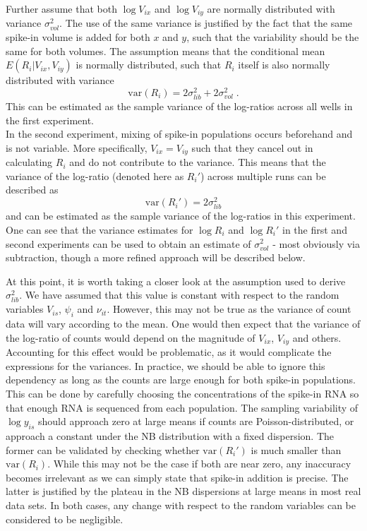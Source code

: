 \documentclass{article}
\begin{document}
Further assume that both $\log V_{ix}$ and $\log V_{iy}$ are normally distributed with variance $\sigma^2_{vol}$.
The use of the same variance is justified by the fact that the same spike-in volume is added for both $x$ and $y$, such that the variability should be the same for both volumes.
The assumption means that the conditional mean $E(R_i |V_{ix}, V_{iy})$ is normally distributed, such that $R_i$ itself is also normally distributed with variance
\[
\mbox{var}(R_i) = 2\sigma^2_{lib} + 2\sigma_{vol}^2 \;. 
\]
This can be estimated as the sample variance of the log-ratios across all wells in the first experiment. \\[0.1in]

In the second experiment, mixing of spike-in populations occurs beforehand and is not variable.
More specifically, $V_{ix}=V_{iy}$ such that they cancel out in calculating $R_i$ and do not contribute to the variance.
This means that the variance of the log-ratio (denoted here as $R_i'$) across multiple runs can be described as
\[
\mbox{var}(R_i') = 2\sigma^2_{lib}
\]
and can be estimated as the sample variance of the log-ratios in this experiment.
One can see that the variance estimates for $\log R_i$ and $\log R_i'$ in the first and second experiments can be used to obtain an estimate of $\sigma^2_{vol}$ - most obviously via subtraction, though a more refined approach will be described below. 

At this point, it is worth taking a closer look at the assumption used to derive $\sigma^2_{lib}$.
We have assumed that this value is constant with respect to the random variables $V_{is}$, $\psi_i$ and $\nu_{it}$.
However, this may not be true as the variance of count data will vary according to the mean.
One would then expect that the variance of the log-ratio of counts would depend on the magnitude of $V_{ix}$, $V_{iy}$ and others.
Accounting for this effect would be problematic, as it would complicate the expressions for the variances.
In practice, we should be able to ignore this dependency as long as the counts are large enough for both spike-in populations.
This can be done by carefully choosing the concentrations of the spike-in RNA so that enough RNA is sequenced from each population.
The sampling variability of $\log y_{is}$ should approach zero at large means if counts are Poisson-distributed, or approach a constant under the NB distribution with a fixed dispersion.
The former can be validated by checking whether $\mbox{var}(R_i')$ is much smaller than $\mbox{var}(R_i)$.
While this may not be the case if both are near zero, any inaccuracy becomes irrelevant as we can simply state that spike-in addition is precise.
The latter is justified by the plateau in the NB dispersions at large means in most real data sets.
In both cases, any change with respect to the random variables can be considered to be negligible. \\[0.1in]
\end{document}
